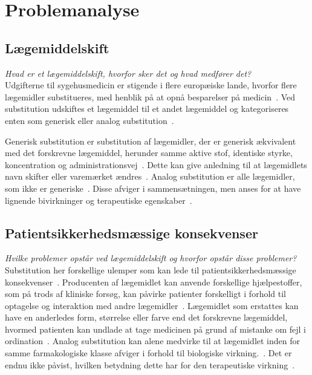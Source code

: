 \chapter{Problemanalyse}

\section{Lægemiddelskift}
\textit{Hvad er et lægemiddelskift, hvorfor sker det og hvad medfører det?} \\
Udgifterne til sygehusmedicin er stigende i flere europæiske lande, hvorfor flere lægemidler substitueres, med henblik på at opnå besparelser på medicin~\citep{Ess2003,Johnston2011}. Ved substitution udskiftes et lægemiddel til et andet lægemiddel og kategoriseres enten som generisk eller analog substitution~\citep{DanskSelskabforPatientsikkerhed2009, Kairi2017}.

Generisk substitution er substitution af lægemidler, der er  generisk ækvivalent med det forskrevne lægemiddel, herunder samme aktive stof, identiske styrke, koncentration og administrationsvej~\citep{DanskSelskabforPatientsikkerhed2009, Kairi2017}. Dette kan give anledning til at lægemidlets navn skifter eller varemærket ændres~\citep{Kairi2017}. Analog substitution er alle lægemidler, som ikke er generiske~\citep{Kairi2017}. Disse afviger i sammensætningen, men anses for at have lignende bivirkninger og terapeutiske egenskaber~\citep{DanskSelskabforPatientsikkerhed2009, Kairi2017}.


\section{Patientsikkerhedsmæssige konsekvenser} \label{sec:ProblemLaeg} %
\textit{Hvilke problemer opstår ved lægemiddelskift og hvorfor opstår disse problemer?} \\
Substitution her forskellige ulemper som kan lede til patientsikkerhedsmæssige konsekvenser~\citep{DanskSelskabforPatientsikkerhed2009}. Producenten af lægemidlet kan anvende forskellige hjælpestoffer, som på trods af kliniske forsøg, kan påvirke patienter forskelligt i forhold til optagelse og interaktion med andre lægemidler~\citep{Kairi2017}. Lægemidlet som erstattes kan have en anderledes form, størrelse eller farve end det forskrevne lægemiddel, hvormed patienten kan undlade at tage medicinen på grund af mistanke om fejl i ordination~\citep{Kairi2017}. Analog substitution kan alene medvirke til at lægemidlet inden for samme farmakologiske klasse afviger i forhold til biologiske virkning.~\citep{Kairi2017}. Det er endnu ikke påvist, hvilken betydning dette har for den terapeutiske virkning~\citep{Kairi2017}. 

